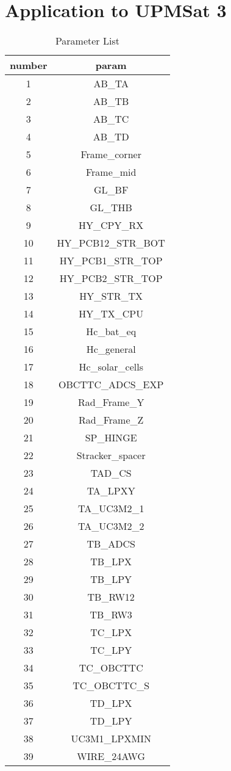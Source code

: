 \chapter{Application to UPMSat 3}

\begin{table}[H]
    \centering
    \caption{Parameter List}
    \begin{tabular}{c c}
    \toprule
    \textbf{number} & \textbf{param} \\ \midrule
    1 & AB\_TA \\
    2 & AB\_TB \\
    3 & AB\_TC \\
    4 & AB\_TD \\
    5 & Frame\_corner \\
    6 & Frame\_mid \\
    7 & GL\_BF \\
    8 & GL\_THB \\
    9 & HY\_CPY\_RX \\
    10 & HY\_PCB12\_STR\_BOT \\
    11 & HY\_PCB1\_STR\_TOP \\
    12 & HY\_PCB2\_STR\_TOP \\
    13 & HY\_STR\_TX \\
    14 & HY\_TX\_CPU \\
    15 & Hc\_bat\_eq \\
    16 & Hc\_general \\
    17 & Hc\_solar\_cells \\
    18 & OBCTTC\_ADCS\_EXP \\
    19 & Rad\_Frame\_Y \\
    20 & Rad\_Frame\_Z \\
    21 & SP\_HINGE \\
    22 & Stracker\_spacer \\
    23 & TAD\_CS \\
    24 & TA\_LPXY \\
    25 & TA\_UC3M2\_1 \\
    26 & TA\_UC3M2\_2 \\
    27 & TB\_ADCS \\
    28 & TB\_LPX \\
    29 & TB\_LPY \\
    30 & TB\_RW12 \\
    31 & TB\_RW3 \\
    32 & TC\_LPX \\
    33 & TC\_LPY \\
    34 & TC\_OBCTTC \\
    35 & TC\_OBCTTC\_S \\
    36 & TD\_LPX \\
    37 & TD\_LPY \\
    38 & UC3M1\_LPXMIN \\
    39 & WIRE\_24AWG \\ \bottomrule
    \end{tabular}
    \end{table}
    